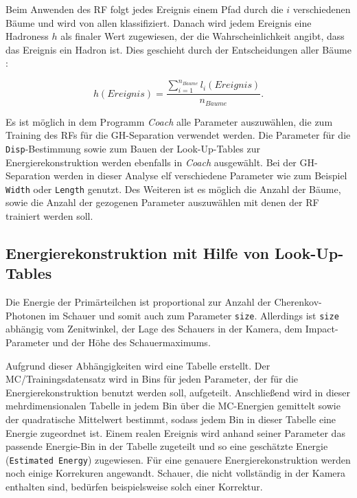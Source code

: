 Beim Anwenden des RF folgt jedes Ereignis einem Pfad durch die $i$ verschiedenen Bäume und wird von allen klassifiziert.
Danach wird jedem Ereignis eine Hadroness $h$ als finaler Wert zugewiesen, der die Wahrscheinlichkeit angibt, dass das Ereignis ein Hadron ist.
Dies geschieht durch der Entscheidungen aller Bäume \cite{RandomForestForMAGIC}: 

\begin{equation}
 h(Ereignis)=\frac{ \sum_{i=1} ^{n_{B\ddot{a}ume}} l_i(Ereignis)}{n_{B\ddot{a}ume}}.
\end{equation}

Es ist möglich in dem Programm \textit{Coach} alle Parameter auszuwählen, die zum Training des RFs für die GH-Separation verwendet werden.
Die Parameter für die \texttt{Disp}-Bestimmung sowie zum Bauen der Look-Up-Tables zur Energierekonstruktion werden ebenfalls in \textit{Coach} ausgewählt.
Bei der GH-Separation werden in dieser Analyse elf verschiedene Parameter wie zum Beispiel \texttt{Width} oder \texttt{Length} genutzt.
Des Weiteren ist es möglich die Anzahl der Bäume, sowie die Anzahl der gezogenen Parameter auszuwählen mit denen der RF trainiert werden soll.

\subsection{Energierekonstruktion mit Hilfe von Look-Up-Tables}
Die Energie der Primärteilchen ist proportional zur Anzahl der Cherenkov-Photonen im Schauer und somit auch zum Parameter \texttt{size}.
Allerdings ist \texttt{size} abhängig vom Zenitwinkel, der Lage des Schauers in der Kamera, dem Impact-Parameter und der Höhe des Schauermaximums.\cite{EnergieRekonstruktion}

Aufgrund dieser Abhängigkeiten wird eine Tabelle erstellt.
Der MC\-/Trainingsdatensatz wird in Bins für jeden Parameter, der für die Energierekonstruktion benutzt werden soll, aufgeteilt.
Anschließend wird in dieser mehrdimensionalen Tabelle in jedem Bin über die MC-Energien gemittelt sowie der quadratische Mittelwert bestimmt, sodass jedem Bin in dieser Tabelle eine Energie zugeordnet ist.
Einem realen Ereignis wird anhand seiner Parameter das passende Energie-Bin in der Tabelle zugeteilt und so eine geschätzte Energie (\texttt{Estimated Energy}) zugewiesen.
Für eine genauere Energierekonstruktion werden noch einige Korrekuren angewandt.
Schauer, die nicht vollständig in der Kamera enthalten sind, bedürfen beispielsweise solch einer Korrektur.\cite{EnergieRekonstruktion}

